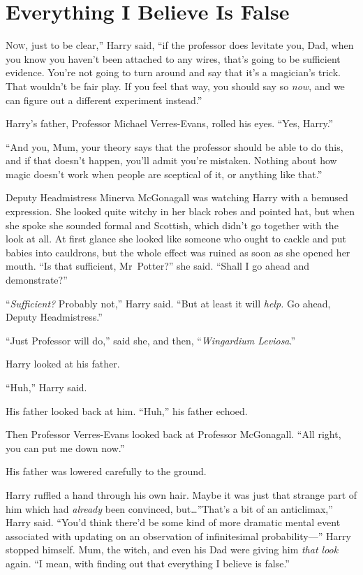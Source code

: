 \chapter{Everything I Believe Is False}

\lettrine[ante=“]{N}{ow}, just to be clear,” Harry said, “if the professor does levitate you, Dad, when you know you haven’t been attached to any wires, that’s going to be sufficient evidence. You’re not going to turn around and say that it’s a magician’s trick. That wouldn’t be fair play. If you feel that way, you should say so \emph{now}, and we can figure out a different experiment instead.”

Harry’s father, Professor Michael Verres-Evans, rolled his eyes. “Yes, Harry.”

“And you, Mum, your theory says that the professor should be able to do this, and if that doesn’t happen, you’ll admit you’re mistaken. Nothing about how magic doesn’t work when people are sceptical of it, or anything like that.”

Deputy Headmistress Minerva McGonagall was watching Harry with a bemused expression. She looked quite witchy in her black robes and pointed hat, but when she spoke she sounded formal and Scottish, which didn’t go together with the look at all. At first glance she looked like someone who ought to cackle and put babies into cauldrons, but the whole effect was ruined as soon as she opened her mouth. “Is that sufficient, Mr~Potter?” she said. “Shall I go ahead and demonstrate?”

“\emph{Sufficient?} Probably not,” Harry said. “But at least it will \emph{help.} Go ahead, Deputy Headmistress.”

“Just Professor will do,” said she, and then, “\emph{Wingardium Leviosa}.”

Harry looked at his father.

“Huh,” Harry said.

His father looked back at him. “Huh,” his father echoed.

Then Professor Verres-Evans looked back at Professor McGonagall. “All right, you can put me down now.”

His father was lowered carefully to the ground.

Harry ruffled a hand through his own hair. Maybe it was just that strange part of him which had \emph{already} been convinced, but…”That’s a bit of an anticlimax,” Harry said. “You’d think there’d be some kind of more dramatic mental event associated with updating on an observation of infinitesimal probability—” Harry stopped himself. Mum, the witch, and even his Dad were giving him \emph{that look} again. “I mean, with finding out that everything I believe is false.”

